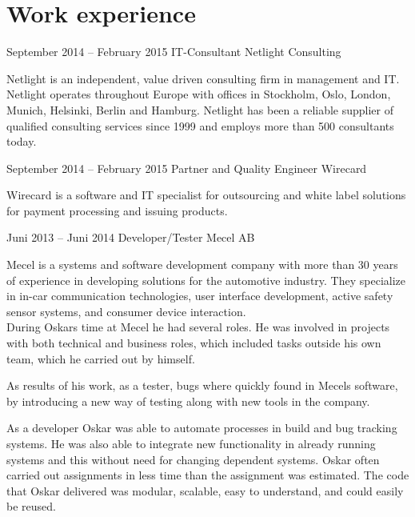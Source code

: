 \documentclass[fontsize=10pt]{tccv}
\begin{document}
\section{Work experience}

\begin{eventlist}

\item{September 2014 -- February 2015}
     {IT-Consultant}
     {Netlight Consulting}

Netlight is an independent, value driven consulting firm in management and IT.
Netlight operates throughout Europe with offices in Stockholm, Oslo, London,
Munich, Helsinki, Berlin and Hamburg. Netlight has been a reliable supplier of
qualified consulting services since 1999 and employs more than 500 consultants
today.


\item{September 2014 -- February 2015}
      {Partner and Quality Engineer}
      {Wirecard}

Wirecard is a software and IT specialist for outsourcing and white label
solutions for payment processing and issuing products.

\newpage

\item{Juni 2013 -- Juni 2014}
     {Developer/Tester}
     {Mecel AB}

Mecel is a systems and software development company with more than 30 years of
experience in developing solutions for the automotive industry. They specialize
in in-car communication technologies, user interface development, active safety
sensor systems, and consumer device interaction.\\

During Oskars time at Mecel he had several roles. He was involved in projects
with both technical and business roles, which included tasks outside his own
team, which he carried out by himself.

As results of his work, as a tester, bugs where quickly found in Mecels
software, by introducing a new way of testing along with new tools in the
company.

As a developer Oskar was able to automate processes in build and bug tracking
systems. He was also able to integrate new functionality in already running
systems and this without need for changing dependent systems. Oskar often
carried out assignments in less time than the assignment was estimated. The
code that Oskar delivered was modular, scalable, easy to understand, and could
easily be reused.



\end{eventlist}
\end{document}
